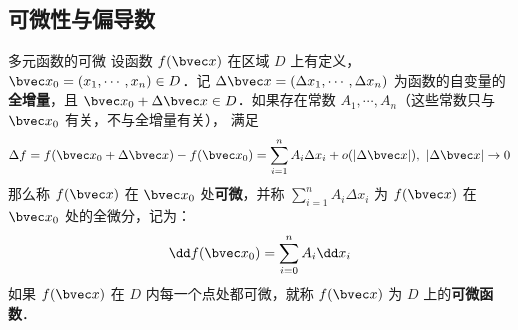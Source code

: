 \subsection{可微性与偏导数}
\begin{definition}{多元函数的可微}
设函数 $f(\bvec x)$ 在区域 $D$ 上有定义，$\bvec x_0=(x_1,\cdots,x_n)\in D$．记 $\Delta \bvec x=(\Delta x_1,\cdots,\Delta x_n)$ 为函数的自变量的\textbf{全增量}，且 $\bvec x_0+\Delta\bvec x\in D$．如果存在常数 $A_1,\cdots,A_n$（这些常数只与 $\bvec x_0$ 有关，不与全增量有关），
满足
\begin{equation}
\Delta f=f(\bvec x_0+\Delta \bvec x)-f(\bvec x_0)=\sum_{i=1}^n A_i \Delta x_i+o(|\Delta \bvec x|),\ |\Delta \bvec x|\rightarrow 0
\end{equation}
那么称 $f(\bvec x)$ 在 $\bvec x_0$ 处\textbf{可微}，并称 $\sum_{i=1}^n A_i \Delta x_i$ 为 $f(\bvec x)$ 在 $\bvec x_0$ 处的全微分，记为：
\begin{equation}
\dd f(\bvec x_0)=\sum_{i=0}^n A_i\dd x_i
\end{equation}
如果 $f(\bvec x)$ 在 $D$ 内每一个点处都可微，就称 $f(\bvec x)$ 为 $D$ 上的\textbf{可微函数}．
\end{definition}